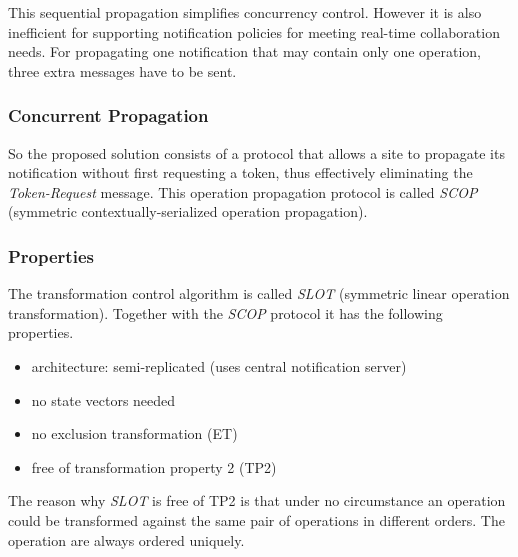 This sequential propagation simplifies concurrency control. However it is also inefficient for supporting notification policies for meeting real-time collaboration needs. For propagating one notification that may contain only one operation, three extra messages have to be sent.


\subsubsection{Concurrent Propagation}
So the proposed solution consists of a protocol that allows a site to propagate its notification without first requesting a token, thus effectively eliminating the \emph{Token-Request} message. This operation propagation protocol is called \emph{SCOP} (symmetric contextually-serialized operation propagation). 


\subsubsection{Properties}
The transformation control algorithm is called \emph{SLOT} (symmetric linear operation transformation). Together with the \emph{SCOP} protocol it has the following properties.

\begin{itemize}
 \item architecture: semi-replicated (uses central notification server)
 \item no state vectors needed
 \item no exclusion transformation (ET)
 \item free of transformation property 2 (TP2)
\end{itemize}

The reason why \emph{SLOT} is free of TP2 is that under no circumstance an operation could be transformed against the same pair of operations in different orders. The operation are always ordered uniquely.

